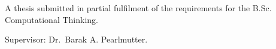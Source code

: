 \begin{titlepage}
\begin{center}
\begin{LARGE}
        \end{LARGE}

        \vspace{20mm}

        \begin{large}A thesis submitted in partial fulfilment of the requirements for the B.Sc. Computational Thinking.\end{large}

        \begin{LARGE}Supervisor: Dr.\ Barak A. Pearlmutter.\end{LARGE}
    \end{center}
\end{titlepage}
